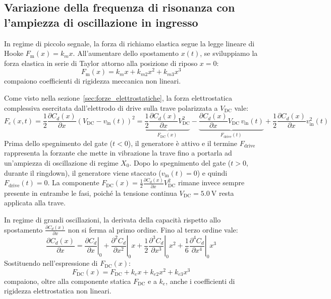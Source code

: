 \documentclass[11pt,a4paper]{article}
\begin{document}
\subsection{Variazione della frequenza di risonanza con l'ampiezza di oscillazione in ingresso}
\label{subsec:variazione_frequenza_ampiezza}

In regime di piccolo segnale, la forza di richiamo elastica segue la legge lineare di Hooke $F_{\text{m}}(x) = k_m x$. All'aumentare dello spostamento $x(t)$, se sviluppiamo la forza elastica in serie di Taylor attorno alla posizione di riposo $x = 0$:
\begin{equation}
        F_{\text{m}}(x) = k_m x + k_{m2} x^2 + k_{m3} x^3
\end{equation}
compaiono coefficienti di rigidezza meccanica non lineari.

\vspace{0.3cm}
\noindent Come visto nella sezione~\ref{sec:forze_elettrostatiche}, la forza elettrostatica complessiva esercitata dall'elettrodo di drive sulla trave polarizzata a $V_{\text{DC}}$ vale:
\begin{equation}
    F_e(x, t) = \frac{1}{2} \frac{\partial C_d(x)}{\partial x} \left( V_{\text{DC}} - v_{\text{in}}(t) \right)^2 = \underbrace{\frac{1}{2} \frac{\partial C_d(x)}{\partial x} V_{\text{DC}}^2}_{F_{\text{DC}}(x)} - \underbrace{\frac{\partial C_d(x)}{\partial x} V_{\text{DC}} \, v_{\text{in}}(t)}_{F_{\text{drive}}(t)} + \frac{1}{2} \frac{\partial C_d(x)}{\partial x} v_{\text{in}}^2(t)
\end{equation}
Prima dello spegnimento del gate ($t < 0$), il generatore è attivo e il termine $F_{\text{drive}}$ rappresenta la forzante che mette in vibrazione la trave fino a portarla ad un'ampiezza di oscillazione di regime $X_0$. Dopo lo spegnimento del gate ($t > 0$, durante il ringdown), il generatore viene staccato ($v_{\text{in}}(t) = 0$) e quindi $F_{\text{drive}}(t) = 0$. La componente $F_{\text{DC}}(x) = \frac{1}{2} \frac{\partial C_d(x)}{\partial x} V_{\text{DC}}^2$ rimane invece sempre presente in entrambe le fasi, poiché la tensione continua $V_{\text{DC}} = \SI{5.0}{\volt}$ resta applicata alla trave.

\vspace{0.3cm}
\noindent In regime di grandi oscillazioni, la derivata della capacità rispetto allo spostamento $\frac{\partial C_d(x)}{\partial x}$ non si ferma al primo ordine. Fino al terzo ordine vale:
\begin{equation}
    \frac{\partial C_d(x)}{\partial x} = \left. \frac{\partial C_d}{\partial x} \right|_0 + \left. \frac{\partial^2 C_d}{\partial x^2} \right|_0 x + \frac{1}{2} \left. \frac{\partial^3 C_d}{\partial x^3} \right|_0 x^2 + \frac{1}{6} \left. \frac{\partial^4 C_d}{\partial x^4} \right|_0 x^3
\end{equation}
Sostituendo nell'espressione di $F_{\text{DC}}(x)$:
\begin{equation}
    F_{\text{DC}}(x) = F_{\text{DC}} + k_e x + k_{e2} x^2 + k_{e3} x^3
\end{equation}
compaiono, oltre alla componente statica $F_{\text{DC}}$ e a $k_e$, anche i coefficienti di rigidezza elettrostatica non lineari.
\end{document}

